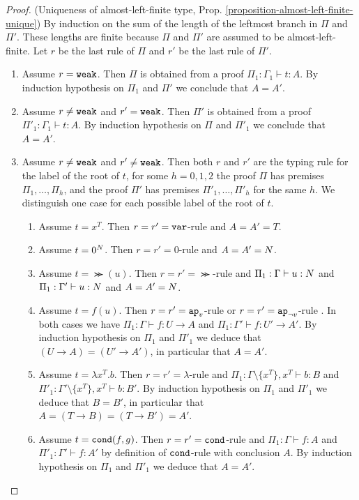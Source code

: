 \begin{proof}(Uniqueness of almost-left-finite type, Prop. \ref{proposition-almost-left-finite-unique})
By induction on the sum of the length of the leftmost branch in $\Pi$ and $\Pi'$. These lengths are finite
because $\Pi$ and $\Pi'$ are assumed to be almost-left-finite. Let $r$ be the last rule of $\Pi$ and $r'$ be the
last rule of $\Pi'$.
\begin{enumerate}
\item
Assume $r = {\tt weak}$. Then $\Pi$ is obtained from a proof $\Pi_1:\Gamma_1 \vdash t:A$. 
By induction hypothesis on $\Pi_1$ and $\Pi'$ we conclude that $A = A'$.

\item
Assume $r \not = {\tt weak}$ and $r' = {\tt weak}$. 
Then $\Pi'$ is obtained from a proof $\Pi'_1:\Gamma_1 \vdash t:A$. 
By induction hypothesis on $\Pi$ and $\Pi'_1$ we conclude that $A = A'$.

\item
Assume  $r \not = {\tt weak}$ and $r' \not = {\tt weak}$. Then both $r$ and $r'$ are the typing rule for the label of the root of $t$, for some
$h=0,1,2$ the proof $\Pi$ has premises $\Pi_1, \ldots, \Pi_h$,
and the proof $\Pi'$ has premises $\Pi'_1, \ldots, \Pi'_h$ for the same $h$. 
We distinguish one case for each possible label of the root of $t$.

\begin{enumerate}
\item
Assume $t = x^T$. Then $r=r'={\tt var}$-rule and $A = A' = T$.

\item
Assume $t =0^{N}$. Then $r=r'=0$-rule and $A = A' = {N}$.

\item
Assume $t =\Succ(u)$. Then $r=r'=\Succ$-rule  and $\Pi_1:\Gamma \vdash u: {N}$
and $\Pi_1:\Gamma' \vdash u:{N}$ and $A = A' = {N}$.

\item
Assume $t = f(u)$. Then $r=r'=\apvar$-rule or $r=r'=\apnotvar$-rule .
In both cases we have $\Pi_1:\Gamma \vdash f:U \rightarrow A$
and $\Pi_1:\Gamma' \vdash f:U' \rightarrow A'$. By induction hypothesis on 
$\Pi_1$ and $\Pi'_1$ we deduce that $(U \rightarrow A) = (U' \rightarrow A')$, 
in particular that $A = A'$.

\item
Assume $t = \lambda x^T.b$. Then $r=r'=\lambda$-rule and 
$\Pi_1:\Gamma\setminus\{x^T\}, x^T \vdash b:B$ and 
$\Pi'_1:\Gamma'\setminus\{x^T\}, x^T \vdash b:B'$. 
By induction hypothesis on $\Pi_1$ and $\Pi'_1$ we deduce that $B=B'$, in particular that $A = (T \rightarrow B) = (T \rightarrow B') = A'$.

\item
Assume $t = {\tt cond}(f,g)$. Then $r=r'={\tt cond}$-rule and $\Pi_1:\Gamma \vdash f:A$
and $\Pi'_1:\Gamma' \vdash f:A'$ by definition of ${\tt cond}$-rule with conclusion
$A$. By induction hypothesis on $\Pi_1$ and
$\Pi'_1$ we deduce that $A = A'$.

\end{enumerate}
\end{enumerate}
\end{proof}

